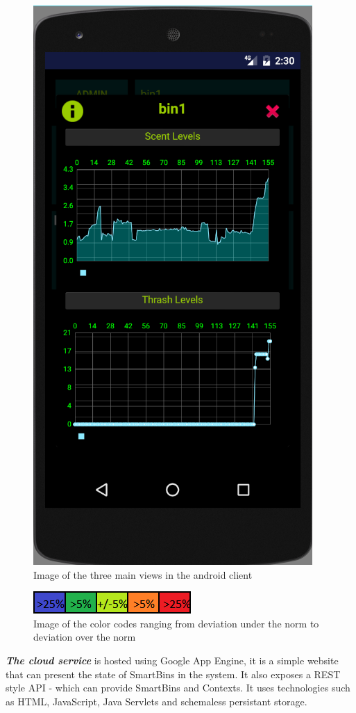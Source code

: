 \begin{figure}
\includegraphics[scale=.3]{img/screen_stats}
\caption{Image of the three main views in the android client} 	
\label{fig:clientmodes}
\end{figure}

\begin{figure}
\centering
\includegraphics{img/app_colors_nb}
\caption{Image of the color codes ranging from deviation under the norm to deviation over the norm} 
\label{fig:colorcodes}
\end{figure}


\textit{ \textbf{The cloud service}} is hosted using Google App Engine, it is a simple website that can present the state of SmartBins in the system. It also exposes a REST style API - which can provide SmartBins and Contexts.
It uses technologies such as HTML, JavaScript, Java Servlets and schemaless persistant storage.


